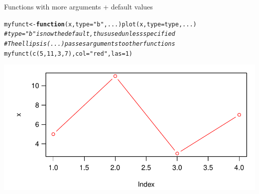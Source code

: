 \documentclass[xcolor=table,      handout ,    xcolor=dvipsnames]{beamer}\usepackage[]{graphicx}\usepackage[]{color}
\makeatletter
\newcommand{\hlnum}[1]{\textcolor[rgb]{0,0,0}{#1}}
\newcommand{\hlstr}[1]{\textcolor[rgb]{0.545,0.137,0.137}{#1}}
\newcommand{\hlcom}[1]{\textcolor[rgb]{0,0.392,0}{\textit{#1}}}
\newcommand{\hlstd}[1]{\textcolor[rgb]{0,0,0}{#1}}
\newcommand{\hlkwa}[1]{\textcolor[rgb]{1,0,0}{\textbf{#1}}}
\newcommand{\hlkwb}[1]{\textcolor[rgb]{0,0,0}{#1}}
\newcommand{\hlkwc}[1]{\textcolor[rgb]{1,0,1}{#1}}
\newcommand{\hlkwd}[1]{\textcolor[rgb]{0,0,1}{#1}}
\newenvironment{kframe}{%
 \def\at@end@of@kframe{}%
 \ifinner\ifhmode%
  \def\at@end@of@kframe{\end{minipage}}%
  \begin{minipage}{\columnwidth}%
 \fi\fi%
 \def\FrameCommand##1{\hskip\@totalleftmargin \hskip-\fboxsep
 \colorbox{shadecolor}{##1}\hskip-\fboxsep
     \hskip-\linewidth \hskip-\@totalleftmargin \hskip\columnwidth}%
 \MakeFramed {\advance\hsize-\width
   \@totalleftmargin\z@ \linewidth\hsize
   \@setminipage}}%
 {\par\unskip\endMakeFramed%
 \at@end@of@kframe}
\newenvironment{knitrout}{}{} %
\makeatother
\begin{document}
\begin{frame}[fragile]{Functions with more arguments + default values}
\begin{knitrout}\small
{}\color{fgcolor}\begin{kframe}
\begin{alltt}
\hlstd{myfunct} \hlkwb{<-} \hlkwa{function}\hlstd{(}\hlkwc{x}\hlstd{,} \hlkwc{type}\hlstd{=}\hlstr{"b"}\hlstd{,} \hlkwc{...}\hlstd{)} \hlkwd{plot}\hlstd{(x,} \hlkwc{type}\hlstd{=type, ...)}
\hlcom{# type="b" is now the default, thus used unless specified}
\hlcom{# The ellipsis (...) passes arguments to other functions}
\hlkwd{myfunct}\hlstd{(}  \hlkwd{c}\hlstd{(}\hlnum{5}\hlstd{,}\hlnum{11}\hlstd{,}\hlnum{3}\hlstd{,}\hlnum{7}\hlstd{) ,} \hlkwc{col}\hlstd{=}\hlstr{"red"}\hlstd{,} \hlkwc{las}\hlstd{=}\hlnum{1}\hlstd{)}
\end{alltt}
\end{kframe}

{\centering \includegraphics[width=\textwidth]{./fig/funct4-1} 

}



\end{knitrout}
\vspace{-2em}
\end{frame}

\end{document}
